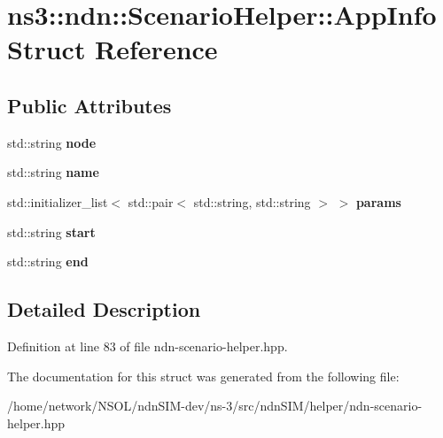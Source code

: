 \hypertarget{structns3_1_1ndn_1_1ScenarioHelper_1_1AppInfo}{}\section{ns3\+:\+:ndn\+:\+:Scenario\+Helper\+:\+:App\+Info Struct Reference}
\label{structns3_1_1ndn_1_1ScenarioHelper_1_1AppInfo}
\subsection*{Public Attributes}
\begin{DoxyCompactItemize}
\item 
std\+::string {\bfseries node}\hypertarget{structns3_1_1ndn_1_1ScenarioHelper_1_1AppInfo_a0319e16e399ede8f8fdf43bd072f09c2}{}\label{structns3_1_1ndn_1_1ScenarioHelper_1_1AppInfo_a0319e16e399ede8f8fdf43bd072f09c2}

\item 
std\+::string {\bfseries name}\hypertarget{structns3_1_1ndn_1_1ScenarioHelper_1_1AppInfo_a83f005f695355567318d80ffa9d0b157}{}\label{structns3_1_1ndn_1_1ScenarioHelper_1_1AppInfo_a83f005f695355567318d80ffa9d0b157}

\item 
std\+::initializer\+\_\+list$<$ std\+::pair$<$ std\+::string, std\+::string $>$ $>$ {\bfseries params}\hypertarget{structns3_1_1ndn_1_1ScenarioHelper_1_1AppInfo_a20787f55246a631f19dad7da50d09907}{}\label{structns3_1_1ndn_1_1ScenarioHelper_1_1AppInfo_a20787f55246a631f19dad7da50d09907}

\item 
std\+::string {\bfseries start}\hypertarget{structns3_1_1ndn_1_1ScenarioHelper_1_1AppInfo_a609bca177aebbb7e39c528101c03ea33}{}\label{structns3_1_1ndn_1_1ScenarioHelper_1_1AppInfo_a609bca177aebbb7e39c528101c03ea33}

\item 
std\+::string {\bfseries end}\hypertarget{structns3_1_1ndn_1_1ScenarioHelper_1_1AppInfo_af846c2cbca8290e343e329363e477805}{}\label{structns3_1_1ndn_1_1ScenarioHelper_1_1AppInfo_af846c2cbca8290e343e329363e477805}

\end{DoxyCompactItemize}


\subsection{Detailed Description}


Definition at line 83 of file ndn-\/scenario-\/helper.\+hpp.



The documentation for this struct was generated from the following file\+:\begin{DoxyCompactItemize}
\item 
/home/network/\+N\+S\+O\+L/ndn\+S\+I\+M-\/dev/ns-\/3/src/ndn\+S\+I\+M/helper/ndn-\/scenario-\/helper.\+hpp\end{DoxyCompactItemize}
